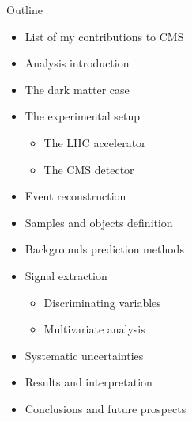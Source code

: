 \documentclass[8pt]{beamer}
\begin{document}
\begin{frame}{Outline}
\justifying
\begin{itemize}
\item List of my contributions to CMS
\item Analysis introduction
\item The dark matter case
\item The experimental setup
\begin{itemize}
\item The LHC accelerator
\item The CMS detector
\end{itemize}

\item Event reconstruction
\item Samples and objects definition
\item Backgrounds prediction methods
\item Signal extraction
\begin{itemize}
\item Discriminating variables
\item Multivariate analysis
\end{itemize}

\item Systematic uncertainties
\item Results and interpretation
\item Conclusions and future prospects
\end{itemize}
\end{frame}
\end{document}
